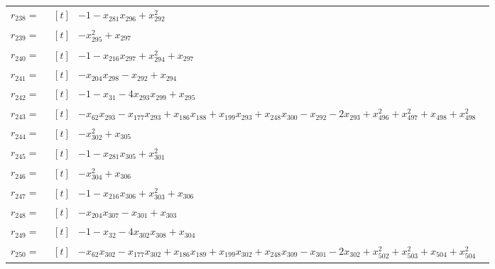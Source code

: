 \begin{longtable}{@{}r p{0.92\linewidth}@{}}
$r_{238}=$ & $\begin{aligned}[t]&-1-x_{281}x_{296}+x_{292}^{2}\end{aligned}$ \\[2pt]
$r_{239}=$ & $\begin{aligned}[t]&-x_{295}^{2}+x_{297}\end{aligned}$ \\[2pt]
$r_{240}=$ & $\begin{aligned}[t]&-1-x_{216}x_{297}+x_{294}^{2}+x_{297}\end{aligned}$ \\[2pt]
$r_{241}=$ & $\begin{aligned}[t]&-x_{204}x_{298}-x_{292}+x_{294}\end{aligned}$ \\[2pt]
$r_{242}=$ & $\begin{aligned}[t]&-1-x_{31}-4x_{293}x_{299}+x_{295}\end{aligned}$ \\[2pt]
$r_{243}=$ & $\begin{aligned}[t]&-x_{62}x_{293}-x_{177}x_{293}+x_{186}x_{188}+x_{199}x_{293}+x_{248}x_{300}-x_{292}-2x_{293}+x_{496}^{2}+x_{497}^{2}+x_{498}+x_{498}^{2}\end{aligned}$ \\[2pt]
$r_{244}=$ & $\begin{aligned}[t]&-x_{302}^{2}+x_{305}\end{aligned}$ \\[2pt]
$r_{245}=$ & $\begin{aligned}[t]&-1-x_{281}x_{305}+x_{301}^{2}\end{aligned}$ \\[2pt]
$r_{246}=$ & $\begin{aligned}[t]&-x_{304}^{2}+x_{306}\end{aligned}$ \\[2pt]
$r_{247}=$ & $\begin{aligned}[t]&-1-x_{216}x_{306}+x_{303}^{2}+x_{306}\end{aligned}$ \\[2pt]
$r_{248}=$ & $\begin{aligned}[t]&-x_{204}x_{307}-x_{301}+x_{303}\end{aligned}$ \\[2pt]
$r_{249}=$ & $\begin{aligned}[t]&-1-x_{32}-4x_{302}x_{308}+x_{304}\end{aligned}$ \\[2pt]
$r_{250}=$ & $\begin{aligned}[t]&-x_{62}x_{302}-x_{177}x_{302}+x_{186}x_{189}+x_{199}x_{302}+x_{248}x_{309}-x_{301}-2x_{302}+x_{502}^{2}+x_{503}^{2}+x_{504}+x_{504}^{2}\end{aligned}$ \\[2pt]

\end{longtable}

